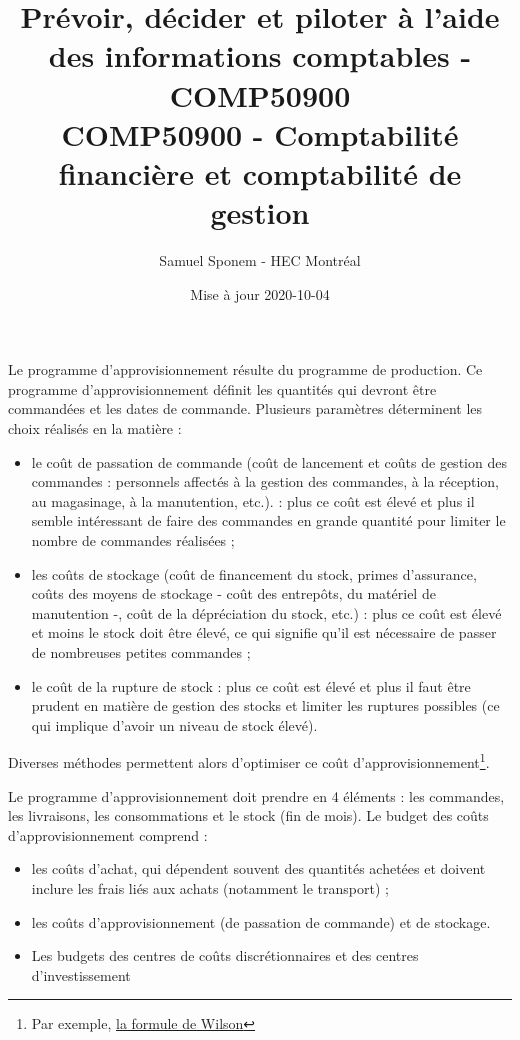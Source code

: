 \documentclass[oneside]{kaobook}
\author{Samuel Sponem - HEC Montréal}
\date{Mise à jour 2020-10-04}
\title{Prévoir, décider et piloter à l'aide des informations comptables - COMP50900\\\medskip
\large COMP50900 - Comptabilité financière et comptabilité de gestion}
\begin{document}
\maketitle
\tableofcontents

Le programme d'approvisionnement résulte du programme de production. Ce programme d'approvisionnement définit les quantités qui devront être commandées et les dates de commande. Plusieurs paramètres déterminent les choix réalisés en la matière :
\begin{itemize}
\item le coût de passation de commande (coût de lancement et coûts de gestion des commandes : personnels affectés à la gestion des commandes, à la réception, au magasinage, à la manutention, etc.). : plus ce coût est élevé et plus il semble intéressant de faire des commandes en grande quantité pour limiter le nombre de commandes réalisées ;
\item les coûts de stockage (coût de financement du stock, primes d'assurance, coûts des moyens de stockage - coût des entrepôts, du matériel de manutention -, coût de la dépréciation du stock, etc.) : plus ce coût est élevé et moins le stock doit être élevé, ce qui signifie qu'il est nécessaire de passer de nombreuses petites commandes ;
\item le coût de la rupture de stock : plus ce coût est élevé et plus il faut être prudent en matière de gestion des stocks et limiter les ruptures possibles (ce qui implique d'avoir un niveau de stock élevé).
\end{itemize}

Diverses méthodes permettent alors d'optimiser ce coût d'approvisionnement\footnote{Par exemple, \href{https://fr.wikipedia.org/wiki/Formule\_de\_Wilson}{la formule de Wilson}}.

Le programme d'approvisionnement doit prendre en 4 éléments : les commandes, les livraisons, les consommations et le stock (fin de mois). Le budget des coûts d'approvisionnement comprend :
\begin{itemize}
\item les coûts d'achat, qui dépendent souvent des quantités achetées et doivent inclure les frais liés aux achats (notamment le transport) ;
\item les coûts d'approvisionnement (de passation de commande) et de stockage.
\end{itemize}
\begin{itemize}
\item Les budgets des centres de coûts discrétionnaires et des centres d'investissement
\end{itemize}
\end{document}
